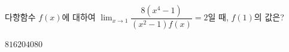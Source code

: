 다항함수 $f(x)$에 대하여 $\displaystyle\lim_{x\to 1}\dfrac{8(x^4-1)}{(x^2-1)f(x)}=2$일 때, $f(1)$의 값은?
\begin{choices32}{$8$}{$16$}{$20$}{$40$}{$80$}\end{choices32}
